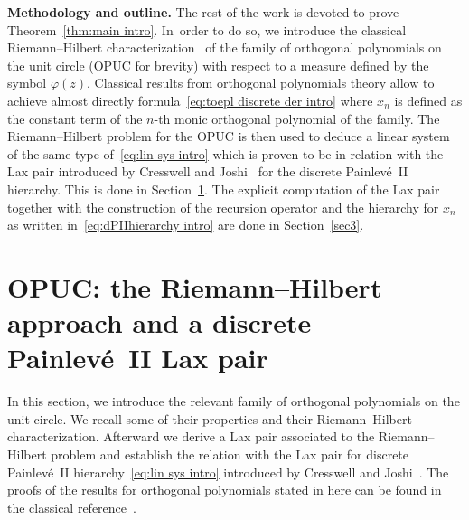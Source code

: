 \documentclass[pdftex]{sigma}%
\numberwithin{equation}{section}
\begin{document}
{\bf Methodology and outline.} The rest of the work is devoted to prove Theorem~\ref{thm:main intro}. In~order to do so, we introduce the classical Riemann--Hilbert characterization~\cite{BaikDeiftSuidan} of the family of orthogonal polynomials on the unit circle (OPUC for brevity) with respect to a measure defined by the symbol $\varphi(z)$. Classical results from orthogonal polynomials theory allow to achieve almost directly formula~\eqref{eq:toepl discrete der intro} where $x_n$ is defined as the constant term of the $n$-th monic orthogonal polynomial of the family. The Riemann--Hilbert problem for the OPUC is then used to deduce a linear system of the same type of~\eqref{eq:lin sys intro} which is proven to be in relation with the Lax pair introduced by Cresswell and Joshi~\cite{joshi1999discrete} for the discrete Painlev\'e~II hierarchy. This is done in Section~\ref{sec2}. The explicit computation of the Lax pair together with the construction of the recursion operator and the hierarchy for $x_n$ as written in~\eqref{eq:dPIIhierarchy intro} are done in Section~\ref{sec3}.

	\section[OPUC: the Riemann--Hilbert approach and a discrete Painlev\'e~II Lax pair]{OPUC: the Riemann--Hilbert approach and a discrete \\Painlev\'e~II Lax pair}
	\label{sec2}
In this section, we introduce the relevant family of orthogonal polynomials on the unit circle. We recall some of their properties and their Riemann--Hilbert characterization. Afterward we derive a Lax pair associated to the Riemann--Hilbert problem and establish the relation with the Lax pair for discrete Painlev\'e~II hierarchy~\eqref{eq:lin sys intro} introduced by Cresswell and Joshi~\cite{joshi1999discrete}. The proofs of the results for orthogonal polynomials stated in here can be found in the classical reference~\cite{BaikDeiftSuidan}.
\end{document}
